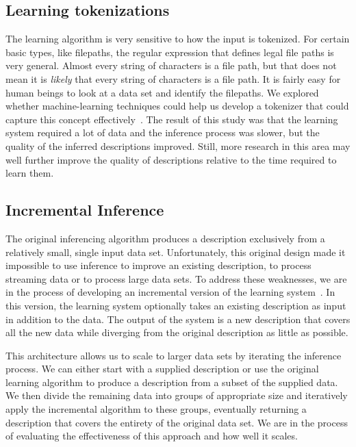 \documentclass{sig-alternate}
\begin{document}
\subsection{Learning tokenizations}
The learning algorithm is very sensitive to how the input is
tokenized.  For certain basic types, like filepaths, the regular
expression that defines legal file paths is very general.  Almost
every string of characters is a file path, but that does not mean it
is \textit{likely} that every string of characters is a file path.  It
is fairly easy for human beings to look at a data set and identify the
filepaths.  We explored whether machine-learning techniques could help
us develop a tokenizer that could capture this concept 
effectively~\cite{Xi+:padl}. The result of this study was that the
learning system required a lot of data and the inference process was
slower, but the quality of the inferred descriptions improved.  Still,
more research in this area may well further improve the quality of descriptions
relative to the time required to learn them.

\subsection{Incremental Inference}
The original inferencing algorithm produces a description exclusively
from a relatively small, single input data set.  Unfortunately,
this original design made it impossible to use inference
to improve an existing description, to process streaming data
or to process large data sets.  To address these weaknesses, we
are in the process of developing an incremental version of the
learning system~\cite{Zhu+:wasl}.  In this version, the learning system optionally
takes an existing description as input in addition to the data.
The output of the system is a new description that covers all the new
data while diverging from the original description as little as
possible.  

This architecture allows us to scale to larger data sets by
iterating the inference process.  We can either start with a supplied
description or use the original learning algorithm to produce a
description from a subset of the supplied data.  We then divide the
remaining data into groups of appropriate size and iteratively apply
the incremental algorithm to these groups, eventually returning a
description that covers the entirety of the original data set.
We are in the process of evaluating the effectiveness of this approach
and how well it scales.
\end{document}
